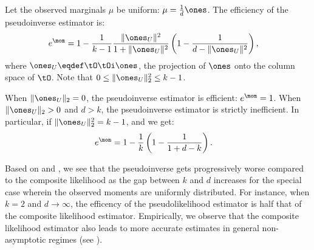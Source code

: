 \begin{lemma}
  Let the observed marginals $\mu$ be uniform: $\mu = \frac{1}{d} \ones$. 
  The efficiency of the pseudoinverse estimator is:
  \begin{align}
    e^\mom &= 
    1 - \frac{1}{k-1}\frac{\|\ones_U\|^2}{1 + \|\ones_U\|^2} \left( 1 - \frac{1}{d - \|\ones_U\|^2} \right) \label{eqn:efficiency},
  \end{align}
  where $\ones_U \eqdef \tO\tOi \ones$, the projection of $\ones$ onto
  the column space of $\tO$. Note that $0 \le \|\ones_U\|^2_2 \le k-1$.

  When $\|\ones_U\|_2 = 0$, the pseudoinverse estimator is efficient:
  $e^\mom = 1$. When $\|\ones_U\|_2 > 0$ and $d > k$, the pseudoinverse
  estimator is strictly inefficient. In particular, if $\|\ones_U\|^2_2
  = k-1$, and we get:
  \begin{align}
    e^\mom 
    &= 1 - \frac{1}{k} \left(1 - \frac{1}{1 + d - k} \right) \label{eqn:k-eff}.
  \end{align}
\end{lemma}

Based on  and , we see that the pseudoinverse gets
progressively worse compared to the composite likelihood as the gap
between $k$ and $d$ increases for the special case wherein the observed
moments are uniformly distributed.
For instance, when $k = 2$ and $d \to \infty$, the efficency of the pseudolikelihood
estimator is half that of the composite likelihood estimator.
Empirically, we observe that the composite likelihood estimator also leads to more
accurate estimates in general non-asymptotic regimes (see ).

